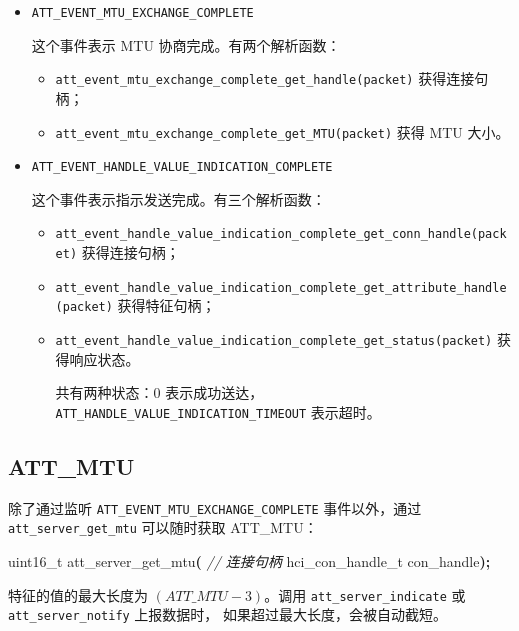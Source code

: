 \documentclass[
  12pt,
]{book}
\newenvironment{Shaded}{\begin{snugshade}}{\end{snugshade}}
\newcommand{\CommentTok}[1]{\textcolor[rgb]{0.56,0.35,0.01}{\textit{#1}}}
\newcommand{\DataTypeTok}[1]{\textcolor[rgb]{0.13,0.29,0.53}{#1}}
\newcommand{\NormalTok}[1]{#1}
\newcommand{\OperatorTok}[1]{\textcolor[rgb]{0.81,0.36,0.00}{\textbf{#1}}}
\providecommand{\tightlist}{%
  \setlength{\itemsep}{0pt}\setlength{\parskip}{0pt}}
\begin{document}
\begin{itemize}
\item
  \texttt{ATT\_EVENT\_MTU\_EXCHANGE\_COMPLETE}

  这个事件表示 MTU 协商完成。有两个解析函数：

  \begin{itemize}
  \tightlist
  \item
    \texttt{att\_event\_mtu\_exchange\_complete\_get\_handle(packet)}
    获得连接句柄；
  \item
    \texttt{att\_event\_mtu\_exchange\_complete\_get\_MTU(packet)}
    获得 MTU 大小。
  \end{itemize}
\item
  \texttt{ATT\_EVENT\_HANDLE\_VALUE\_INDICATION\_COMPLETE}

  这个事件表示指示发送完成。有三个解析函数：

  \begin{itemize}
  \item
    \texttt{att\_event\_handle\_value\_indication\_complete\_get\_conn\_handle(packet)}
    获得连接句柄；
  \item
    \texttt{att\_event\_handle\_value\_indication\_complete\_get\_attribute\_handle(packet)}
    获得特征句柄；
  \item
    \texttt{att\_event\_handle\_value\_indication\_complete\_get\_status(packet)}
    获得响应状态。

    共有两种状态：\(0\) 表示成功送达，\texttt{ATT\_HANDLE\_VALUE\_INDICATION\_TIMEOUT} 表示超时。
  \end{itemize}
\end{itemize}

\hypertarget{att_mtu}{%
\subsection{ATT\_MTU}\label{att_mtu}}

除了通过监听 \texttt{ATT\_EVENT\_MTU\_EXCHANGE\_COMPLETE} 事件以外，通过 \texttt{att\_server\_get\_mtu} 可以随时获取 ATT\_MTU：

\begin{Shaded}
\begin{Highlighting}[]
\DataTypeTok{uint16\_t}\NormalTok{ att\_server\_get\_mtu}\OperatorTok{(}
  \CommentTok{// 连接句柄}
\NormalTok{  hci\_con\_handle\_t con\_handle}\OperatorTok{);}
\end{Highlighting}
\end{Shaded}

特征的值的最大长度为 \((ATT\_MTU - 3)\)。调用 \texttt{att\_server\_indicate} 或 \texttt{att\_server\_notify} 上报数据时，
如果超过最大长度，会被自动截短。
\end{document}
